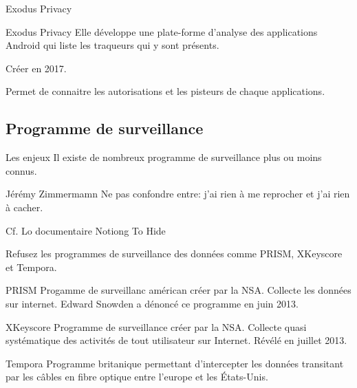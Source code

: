 \documentclass[compress]{beamer}
\begin{document}
\begin{frame}{Exodus Privacy}
\begin{block}{Exodus Privacy}
Elle développe une plate-forme d'analyse des applications Android qui liste les traqueurs qui y sont présents.
\end{block}
Créer en 2017.\newline
\end{frame}

\begin{frame}
Permet de connaitre les autorisations et les pisteurs de chaque applications.
\end{frame}

\subsection{Programme de surveillance}
\begin{frame}{Les enjeux}
Il existe de nombreux programme de surveillance plus ou moins connus.
\begin{block}{Jérémy Zimmermamn}
Ne pas confondre entre: j'ai rien à me reprocher et j'ai rien à cacher.
\end{block}
Cf. Lo documentaire Notiong To Hide
\end{frame}

\begin{frame}{}
Refusez les programmes de surveillance des données comme PRISM, XKeyscore et Tempora.

\begin{tiny}
\begin{block}{PRISM}
Progamme de surveillanc américan créer par la NSA. Collecte les données sur internet.
Edward Snowden a dénoncé ce programme en juin 2013.
\end{block}

\begin{block}{XKeyscore}
Programme de surveillance créer par la NSA. Collecte quasi systématique des activités de tout utilisateur sur Internet. Révélé en juillet 2013.
\end{block}

\begin{block}{Tempora}
Programme britanique permettant d'intercepter les données transitant par les câbles en fibre optique 	entre l'europe et les États-Unis.
\end{block}
\end{tiny}
\end{frame}
\end{document}
